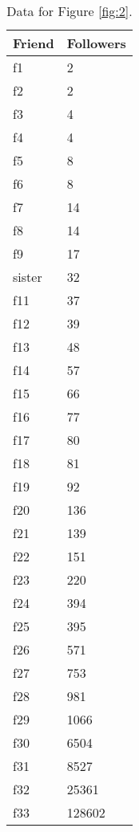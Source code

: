 \begin{table}[!htbp]
	\caption{Twitter Followers Data} \label{tab:table2}
	\small
	\begin{center}
	\vspace{-5mm}
	\begin{minipage}{0.22\textwidth}
		\begin{tabular}{|l | l|}
			\hline
			\multicolumn{1}{|c|}{Friend} & \multicolumn{1}{c|}{Followers}\\
			\hline
			f1 & 2\\
			f2 & 2\\
			f3 & 4\\
			f4 & 4\\
			f5 & 8\\
			f6 & 8\\
			f7 & 14\\
			f8 & 14\\
			f9 & 17\\
			sister & 32\\
			f11 & 37\\
			f12 & 39\\
			f13 & 48\\
			f14 & 57\\
			f15 & 66\\
			f16 & 77\\
			f17 & 80\\
			f18 & 81\\
			f19 & 92\\
			f20 & 136\\
			f21 & 139\\
			f22 & 151\\
			f23 & 220\\
			f24 & 394\\
			f25 & 395\\
			f26 & 571\\
			f27 & 753\\
			f28 & 981\\
			f29 & 1066\\
			f30 & 6504\\
			f31 & 8527\\
			f32 & 25361\\
			f33 & 128602\\
			\hline
		\end{tabular}
	\end{minipage}	
	\caption*{\scriptsize Data for Figure \ref{fig:2}.}
	 \end{center}
\end{table}

